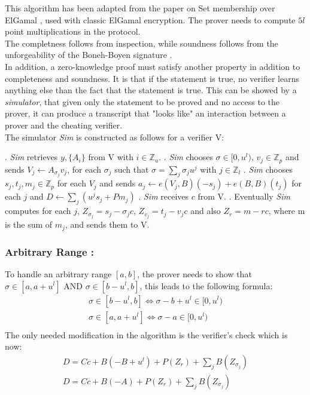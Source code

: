 \documentclass{article}
\begin{document}
This algorithm has been adapted from the paper on Set membership over ElGamal \cite{range}, used with classic ElGamal encryption. The prover needs to compute $5l$ point multiplications in the protocol.\\
The completness follows from inspection, while soundness follows from the unforgeability of the Boneh-Boyen signature \cite{boneh}.\\
In addition, a zero-knowledge proof must satisfy another property in addition to completeness and soundness. It is that if the statement is true, no verifier learns anything else than the fact that the statement is true.
This can be showed by a \textit{simulator}, that given only the statement to be proved and no access to the prover, it can produce a transcript that "looks like" an interaction between a prover and the cheating verifier.\\
The simulator \textit{Sim} is constructed as follows for a verifier V:\\

\begin{algorithmic}
. \textit{Sim} retrieves $y,\{A_i\}$ from V with $i \in \mathbb{Z}_u$.
. \textit{Sim} chooses $\sigma \in [0,u^l)$, $v_j \in \mathbb{Z}_p$ and sends $V_j \gets A_{\sigma_j} v_j$, for each $\sigma_j$ such that $\sigma = \sum_{j}{\sigma_j u^j}$ with $ j \in \mathbb{Z}_l$
. \textit{Sim} chooses $s_j,t_j,m_j \in \mathbb{Z}_p$ for each $V_j$ and sends $a_j \gets e(V_j,B)(-s_j) + e(B,B)(t_j)$ for each $j$ and $D \gets \sum_{j}{(u^j s_j + Pm_j)}$
. \textit{Sim} receives $c$ from V.
. Eventually \textit{Sim} computes for each $j$, $Z_{\sigma_j} =s_j - \sigma_j c$, $Z_{v_j} = t_j - v_j c$ and also $Z_r = m - rc$, where m is the sum of $m_j$, and sends them to V.  
\end{algorithmic}

\subsubsection*{Arbitrary Range :}
To handle an arbitrary range $[a,b]$, the prover needs to show that $\sigma \in [a,a+u^l]$ AND $ \sigma \in [b-u^l,b]$, this leads to the following formula:\\
\begin{gather*}
 \sigma \in [b-u^l,b] \Longleftrightarrow   \sigma - b + u^l \in [0,u^l) \\
\sigma \in [a,a+u^l] \Longleftrightarrow   \sigma - a  \in [0,u^l)\\
\end{gather*}
The only needed modification in the algorithm is the verifier's check which is now:
\begin{gather*}
D = Cc+B(-B+u^l)+P(Z_r)+\sum_j{B(Z_{\sigma_j})}\\
D= Cc+B(-A)+P(Z_r)+\sum_j{B(Z_{\sigma_j})}
\end{gather*}
\end{document}
